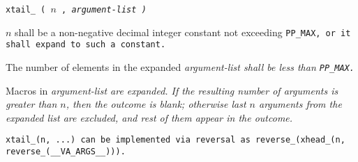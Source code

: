 
\tt{xtail_ (} $n$ \tt{,} \it{argument-list} \tt{)}


$n$ shall be a non-negative decimal integer constant not exceeding \tt{PP_MAX},
or it shall expand to such a constant.

The number of elements in the expanded
\it{argument-list} shall be less than \tt{PP_MAX}.


Macros in \it{argument-list} are expanded.
If the resulting number of arguments is greater than $n$,
then the outcome is  blank; otherwise last $n$ arguments from the
expanded list are excluded, and rest of them appear in the outcome.

\note \tt{xtail_(n, ...)} can be implemented via reversal as
\tt{reverse_(xhead_(n, reverse_(__VA_ARGS__)))}.
